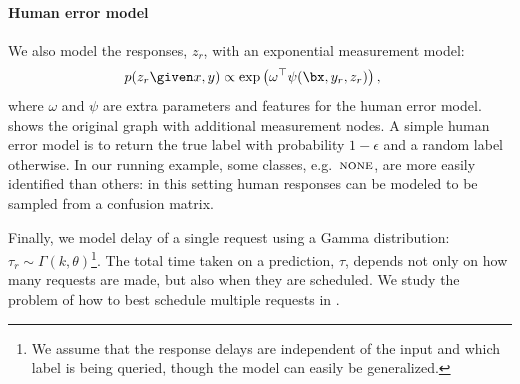 
\paragraph{Human error model}
We also model the responses, $z_r$, with an exponential measurement model:
\begin{align*}
  p(z_r \given x, y) 
  &\propto \exp \left( \omega^\top\psi(\bx, y_r, z_r) \right),
\end{align*}
where $\omega$ and $\psi$ are extra parameters and features for the human error model. 
 shows the original graph with additional measurement nodes.
A simple human error model is to return the true label with probability $1-\epsilon$ and a random label otherwise.
In our running example, some classes, e.g.\ $\textsc{none}$, are more easily identified than others: in this setting human responses can be modeled to be sampled from a confusion matrix.

Finally, we model delay of a single request using a Gamma distribution: $\tau_r \sim \Gamma(k, \theta)$\footnote{We assume that the response delays are independent of the input and which label is being queried, though the model can easily be generalized.}.
The total time taken on a prediction, $\tau$, depends not only on how many requests are made, but also when they are scheduled.
We study the problem of how to best schedule multiple requests in .



